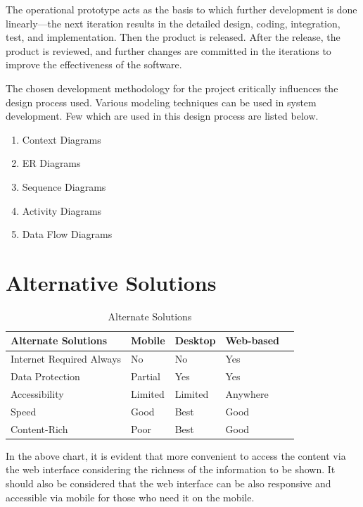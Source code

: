 \documentclass[12pt,a4paper]{report}
\begin{document}
The operational prototype acts as the basis to which further development is done linearly—the next iteration results in the detailed design, coding, integration, test, and implementation. Then the product is released. After the release, the product is reviewed, and further changes are committed in the iterations to improve the effectiveness of the software.  

The chosen development methodology for the project critically influences the design process used. Various modeling techniques can be used in system development. Few which are used in this design process are listed below. 

\begin{enumerate}
	\item Context Diagrams
	\item ER Diagrams
	\item Sequence Diagrams
	\item Activity Diagrams
	\item Data Flow Diagrams
\end{enumerate}

\section{Alternative Solutions}

\begin{table}[h]
\begin{tabular}{|l|l|l|l|l|}
\hline
 \textbf{Alternate Solutions} & \textbf{Mobile}  & \textbf{Desktop}  & \textbf{Web-based}   \\ \hline
 Internet Required Always& No  & No & Yes  \\ \hline
 Data Protection & Partial & Yes & Yes   \\ \hline
 Accessibility & Limited  & Limited & Anywhere   \\ \hline
 Speed & Good  & Best & Good   \\ \hline
 Content-Rich & Poor  & Best & Good   \\ \hline
\end{tabular}
\centering
\caption{Alternate Solutions}
\end{table}
In the above chart, it is evident that more convenient to access the content via the web interface considering the richness of the information to be shown. It should also be considered that the web interface can be also responsive and accessible via mobile for those who need it on the mobile.
\end{document}
